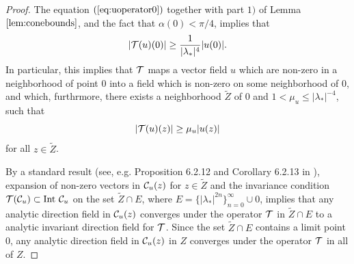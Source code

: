 \begin{proof}
{The equation $(\ref{eq:uoperator0})$ together with part $1)$  of Lemma $\ref{lem:conebounds}$, and the fact that $\alpha(0)<\pi/4$,  implies that 
$$|\mathcal{T}(u)(0)|  \ge  {1 \over |\lambda_*|^4} |u(0)|.$$
In particular, this implies that $\mathcal{T}$ maps a vector field $u$ which are non-zero in a neighborhood of point $0$ into a field which is non-zero on some neighborhood of $0$, and which, furthrmore, there exists a neighborhood $\tilde{Z}$ of $0$ and $1 < \mu_u  \le {|\lambda_*|^{-4}}$, such that
\begin{equation}
\label{eq:expansion}  |\mathcal{T}(u)(z)| \ge \mu_u |u(z)|
\end{equation}
for all $z \in \tilde{Z}$.

By a standard result (see, e.g. Proposition 6.2.12 and Corollary 6.2.13 in \cite{KH}), expansion of non-zero vectors in $\mathcal{C}_u(z)$ for $z \in \tilde{Z}$   and   the   invariance condition $\mathcal{T}(\mathcal{C}_u) \subset {\rm Int} \ \mathcal{C}_u$ on the set $\tilde{Z} \cap E$, where $E=\{|\lambda_*|^{2n}\}_{n=0}^\infty \cup 0$, implies that any  analytic direction field in $\mathcal{C}_u(z)$ converges under the operator $\mathcal{T}$ in $\tilde{Z} \cap E$ to a  analytic invariant direction field for $\mathcal{T}$.  Since the set $\tilde{Z} \cap E$ contains a limit point $0$,  any  analytic direction field in $\mathcal{C}_u(z)$ in $Z$ converges under the operator $\mathcal{T}$ in all of $Z$. 




}
\end{proof}
